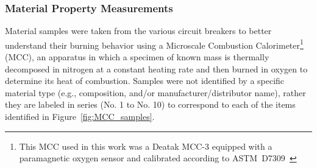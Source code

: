 \subsubsection{Material Property Measurements}
\label{ssec:MCC}
Material samples were taken from the various circuit breakers to better understand their burning behavior using a Microscale Combustion Calorimeter\footnote{This MCC used in this work was a Deatak MCC-3 equipped with a paramagnetic oxygen sensor and calibrated according to ASTM~D7309~\cite{ASTM_D7309}} (MCC), an apparatus in which a specimen of known mass is thermally decomposed in nitrogen at a constant heating rate and then burned in oxygen to determine its heat of combustion. Samples were not identified by a specific material type (e.g., composition, and/or manufacturer/distributor name), rather they are labeled in series (No. 1 to No. 10) to correspond to each of the items identified in Figure~\ref{fig:MCC_samples}.


